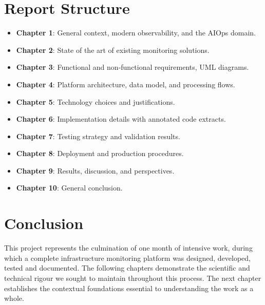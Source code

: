 \section{Report Structure}

\begin{itemize}
  \item \textbf{Chapter 1}: General context, modern observability, and the AIOps domain.
  \item \textbf{Chapter 2}: State of the art of existing monitoring solutions.
  \item \textbf{Chapter 3}: Functional and non-functional requirements, UML diagrams.
  \item \textbf{Chapter 4}: Platform architecture, data model, and processing flows.
  \item \textbf{Chapter 5}: Technology choices and justifications.
  \item \textbf{Chapter 6}: Implementation details with annotated code extracts.
  \item \textbf{Chapter 7}: Testing strategy and validation results.
  \item \textbf{Chapter 8}: Deployment and production procedures.
  \item \textbf{Chapter 9}: Results, discussion, and perspectives.
  \item \textbf{Chapter 10}: General conclusion.
\end{itemize}

\section*{Conclusion}

This project represents the culmination of one month of intensive work, during
which a complete infrastructure monitoring platform was designed, developed,
tested and documented. The following chapters demonstrate the scientific and
technical rigour we sought to maintain throughout this process. The next
chapter establishes the contextual foundations essential to understanding the
work as a whole.
